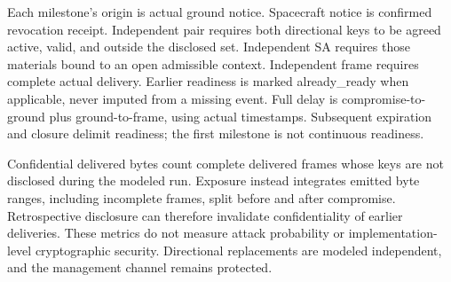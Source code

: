 \documentclass[12pt,a4paper]{article}
\begin{document}
Each milestone's origin is actual ground notice. Spacecraft notice is confirmed revocation receipt. Independent pair requires both directional keys to be agreed active, valid, and outside the disclosed set. Independent SA requires those materials bound to an open admissible context. Independent frame requires complete actual delivery. Earlier readiness is marked already\_ready when applicable, never imputed from a missing event. Full delay is compromise-to-ground plus ground-to-frame, using actual timestamps. Subsequent expiration and closure delimit readiness; the first milestone is not continuous readiness.

Confidential delivered bytes count complete delivered frames whose keys are not disclosed during the modeled run. Exposure instead integrates emitted byte ranges, including incomplete frames, split before and after compromise. Retrospective disclosure can therefore invalidate confidentiality of earlier deliveries. These metrics do not measure attack probability or implementation-level cryptographic security. Directional replacements are modeled independent, and the management channel remains protected.
\end{document}
